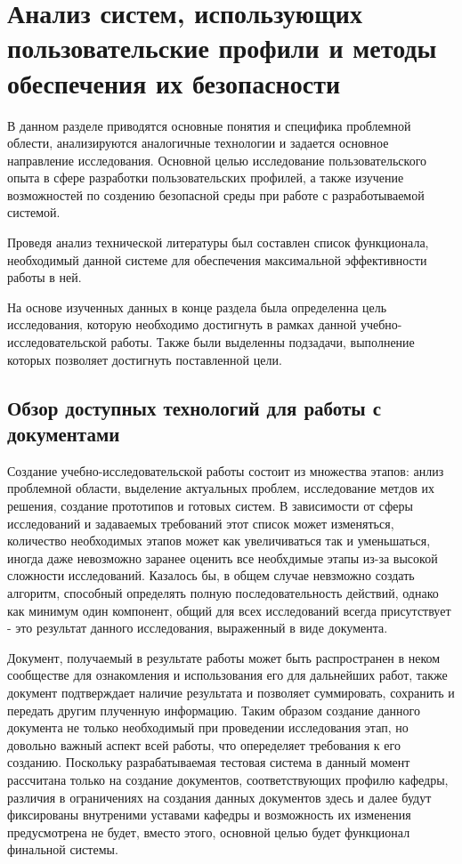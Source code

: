 \chapter{Анализ систем, использующих пользовательские профили и методы обеспечения их безопасности}
\label{chapter1}

В данном разделе приводятся основные понятия и специфика проблемной облести, анализируются аналогичные технологии и задается основное направление исследования. Основной целью исследование пользовательского опыта в сфере разработки пользовательских профилей, а также изучение возможностей по создению безопасной среды при работе с разработываемой системой.

Проведя анализ технической литературы был составлен список функционала, необходимый данной системе для обеспечения максимальной эффективности работы в ней.

На основе изученных данных в конце раздела была определенна цель исследования,  которую необходимо достигнуть в рамках данной учебно-
исследовательской работы. Также были выделенны подзадачи, выполнение которых позволяет достигнуть поставленной цели.


\section{Обзор доступных технологий для работы с документами}

Создание учебно-исследовательской работы состоит из множества этапов: анлиз проблемной области, выделение актуальных проблем, исследование метдов их решения, создание прототипов и готовых систем. В зависимости от сферы исследований и задаваемых требований этот список может изменяться, количество необходимых этапов может как увеличиваться так и уменьшаться, иногда даже невозможно заранее оценить все необхдимые этапы из-за высокой сложности исследований. Казалось бы, в общем случае невзможно создать алгоритм, способный определять полную последовательность действий, однако как минимум один компонент, общий для всех исследований всегда присутствует - это результат данного исследования, выраженный в виде документа.

Документ, получаемый в результате работы может быть распространен в неком сообществе для ознакомления и использования его для дальнейших работ, также документ подтверждает наличие результата и позволяет суммировать, сохранить и передать другим плученную информацию. Таким образом создание данного документа не только необходимый при проведении исследования этап, но довольно важный аспект всей работы, что опеределяет требования к его созданию. Поскольку разрабатываемая тестовая система в данный момент рассчитана только на создание документов, соответствующих профилю кафедры, различия в ограничениях на создания данных документов здесь и далее будут фиксированы внутреними уставами кафедры и возможность их изменения предусмотрена не будет, вместо этого, основной целью будет функционал финальной системы.

